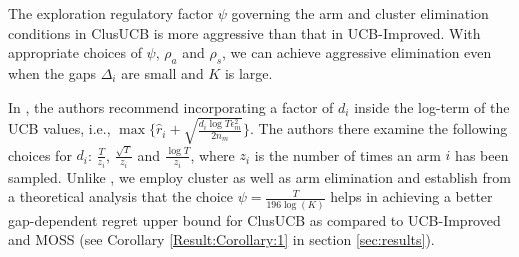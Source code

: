 The exploration regulatory factor $\psi$ governing the arm and cluster elimination conditions in ClusUCB is more aggressive than that in UCB-Improved. With appropriate choices of $\psi$, $\rho_a$ and $\rho_s$, we can achieve aggressive elimination even when the gaps $\Delta_i$ are small and $K$ is large. 


In \cite{liu2016modification}, the authors recommend incorporating a factor of $d_i$ inside the log-term of the UCB values, i.e., $\max \lbrace\hat{r}_{i}+\sqrt{\frac{d_{i}\log T{\epsilon}_{m}^{2}}{2n_{m}}}\rbrace$. 
The authors there examine the following choices for $d_i$: $\frac{T}{z_{i}}$, $\frac{\sqrt{T}}{z_{i}}$ and $\frac{\log T}{z_{i}}$, where $z_{i}$ is the number of times an arm ${i}$ has been sampled.
Unlike \cite{liu2016modification}, we employ cluster as well as arm elimination and establish from a theoretical analysis that the choice $\psi=\frac{T}{196\log (K)}$ helps in achieving a better gap-dependent regret upper bound for ClusUCB as compared to UCB-Improved and MOSS (see Corollary \ref{Result:Corollary:1} in section \ref{sec:results}). 






